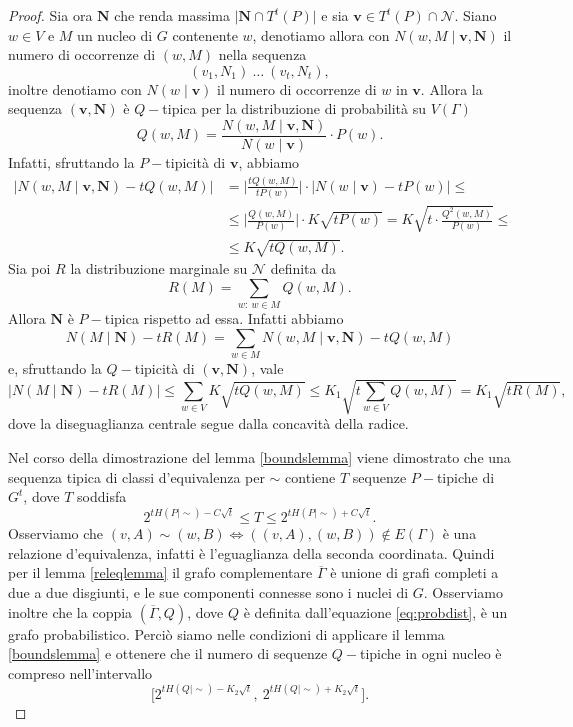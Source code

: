 \begin{proof}
	Sia ora \(\mathbf{N}\) che renda massima \(\big\vert \mathbf{N}\cap T^t(P) \big\vert\) e sia \(\mathbf{v}\in T^t(P)\cap \mathcal{N}\). Siano \(w\in V\) e \(M\) un nucleo di \(G\) contenente \(w\), denotiamo allora con \(N(w,M\mid \mathbf{v}, \mathbf{N})\) il numero di occorrenze di \((w,M)\) nella sequenza
	\[(v_1, N_1)\ \dots\ (v_t, N_t),\]
	inoltre denotiamo con \(N(w\mid \mathbf{v})\) il numero di occorrenze di \(w\) in \(\mathbf{v}\). Allora la sequenza \((\mathbf{v}, \mathbf{N})\) è \(Q-\)tipica per la distribuzione di probabilità su \(V(\Gamma)\) 
	\begin{equation}
		\label{eq:probdist} Q(w,M)=\frac{N(w,M\mid \mathbf{v}, \mathbf{N})}{N(w\mid \mathbf{v})}\cdot P(w). 
	\end{equation}
	Infatti, sfruttando la \(P-\)tipicità di \(\mathbf{v}\), abbiamo 
	\begin{align}
		\big\vert N(w,M\mid \mathbf{v}, \mathbf{N}) - tQ(w,M)\big\vert &= \bigg\vert \frac{tQ(w,M)}{tP(w)}\bigg\vert \cdot \big\vert N(w\mid \mathbf{v}) - tP(w)\big\vert \le \nonumber \\
		&\le \bigg\vert \frac{Q(w,M)}{P(w)}\bigg\vert \cdot K\sqrt{tP(w)} = K\sqrt{t\cdot\frac{Q^{2}(w,M)}{P(w)}} \le \nonumber \\
		&\le K\sqrt{tQ(w,M)}. \nonumber 
	\end{align}
	Sia poi \(R\) la distribuzione marginale su \(\mathcal{N}\) definita da
	\[R(M)=\sum_{w:\ w\in M} Q(w,M).\]
	Allora \(\mathbf{N}\) è \(P-\)tipica rispetto ad essa. Infatti abbiamo
	\[N(M\mid \mathbf{N})-tR(M)=\sum_{w\in M} N(w,M\mid \mathbf{v},\mathbf{N})-tQ(w,M)\]
	e, sfruttando la \(Q-\)tipicità di \((\mathbf{v}, \mathbf{N})\), vale
	\[\big\vert N(M\mid \mathbf{N})-tR(M) \big\vert\le \sum_{w\in V} K\sqrt{tQ(w,M)}\le K_{1}\sqrt{t\sum_{w\in V} Q(w,M)}=K_{1}\sqrt{tR(M)},\]
	dove la diseguaglianza centrale segue dalla concavità della radice.
	
	Nel corso della dimostrazione del lemma \ref{boundslemma} viene dimostrato che una sequenza tipica di classi d'equivalenza per \(\sim\) contiene \(T\) sequenze \(P-\)tipiche di \(G^t\), dove \(T\) soddisfa
	\[2^{tH(P\mid\sim)-C\sqrt{t}}\le T\le 2^{tH(P\mid\sim)+C\sqrt{t}}.\]
	Osserviamo che \((v,A)\sim (w,B) \iff ((v,A),(w,B))\not\in E(\Gamma)\) è una relazione d'equivalenza, infatti è l'eguaglianza della seconda coordinata. Quindi per il lemma \ref{releqlemma} il grafo complementare \(\overline{\Gamma}\) è unione di grafi completi a due a due disgiunti, e le sue componenti connesse sono i nuclei di \(G\). Osserviamo inoltre che la coppia \((\overline{\Gamma}, Q)\), dove \(Q\) è definita dall'equazione \eqref{eq:probdist}, è un grafo probabilistico. Perciò siamo nelle condizioni di applicare il lemma \ref{boundslemma} e ottenere che il numero di sequenze \(Q-\)tipiche in ogni nucleo è compreso nell'intervallo 
	\begin{equation}
		\label{eq:bounds} \Big[2^{tH(Q\mid\sim)-K_{2}\sqrt{t}},\ 2^{tH(Q\mid\sim)+K_{2}\sqrt{t}}\Big]. 
	\end{equation}
	

\end{proof}
